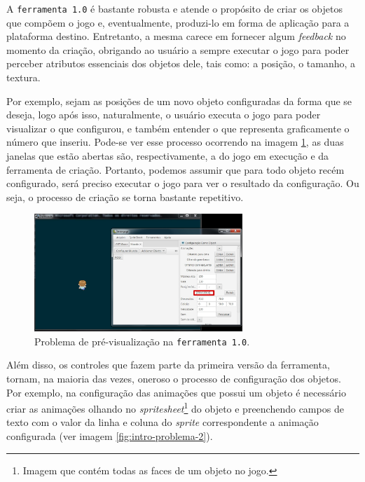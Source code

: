 \documentclass[12pt,twoside,openright,a4paper,english,brazil,sumario=tradicional]{abntex2}
\begin{document}
A \texttt{ferramenta 1.0} é bastante robusta e atende o propósito de criar os objetos que compõem o jogo e, eventualmente, produzi-lo em forma de aplicação para a plataforma destino. Entretanto, a mesma carece em fornecer algum \emph{feedback} no momento da criação, obrigando ao usuário a sempre executar o jogo para poder perceber atributos essenciais dos objetos dele, tais como: a posição, o tamanho, a textura.

Por exemplo, sejam as posições de um novo objeto configuradas da forma que se deseja, logo após isso, naturalmente, o usuário executa o jogo para poder visualizar o que configurou, e também entender o que representa graficamente o número que inseriu. Pode-se ver esse processo ocorrendo na imagem \ref{fig:intro-problema-1}, as duas janelas que estão abertas são, respectivamente, a do jogo em execução e da ferramenta de criação. Portanto, podemos assumir que para todo objeto recém configurado, será preciso executar o jogo para ver o resultado da configuração. Ou seja, o processo de criação se torna bastante repetitivo.

\begin{figure}[h]
   \label{fig:intro-problema-1}
   \centering
   \includegraphics[width=0.7\textwidth]{images/problema-1.jpg}
   \caption{Problema de pré-visualização na \texttt{ferramenta 1.0}.}
\end{figure}

Além disso, os controles que fazem parte da primeira versão da ferramenta, tornam, na maioria das vezes, oneroso o processo de configuração dos objetos. Por exemplo, na configuração das animações que possui um objeto é necessário criar as animações olhando no \emph{spritesheet}\footnote{Imagem que contém todas as faces de um objeto no jogo.} do objeto e preenchendo campos de texto com o valor da linha e coluna do \emph{sprite} correspondente a animação configurada (ver imagem \ref{fig:intro-problema-2}).
\end{document}
